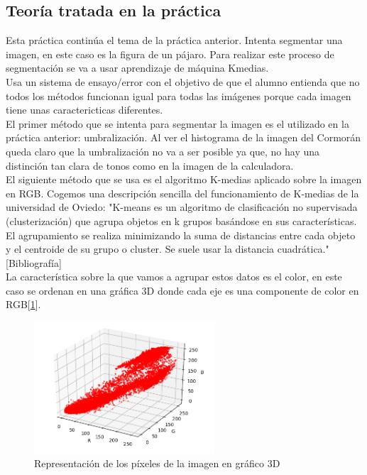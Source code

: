 \documentclass[a4paper,12pt]{report}
\begin{document}
\subsection{Teoría tratada en la práctica}

Esta práctica continúa el tema de la práctica anterior. Intenta segmentar una imagen, en este caso es la figura de un pájaro. Para realizar este proceso de segmentación se va a usar aprendizaje de máquina Kmedias.\\

Usa un sistema de ensayo/error con el objetivo de que el alumno entienda que no todos los métodos funcionan igual para todas las imágenes porque cada imagen tiene unas caractericticas diferentes.\\

El primer método que se intenta para segmentar la imagen es el utilizado en la práctica anterior: umbralización. Al ver el histograma de la imagen del Cormorán queda claro que la umbralización no va a ser posible ya que, no hay una distinción tan clara de tonos como en la imagen de la calculadora.\\

El siguiente método que se usa es el algoritmo K-medias aplicado sobre la imagen en RGB. Cogemos una descripción sencilla del funcionamiento de K-medias de la universidad de Oviedo: "K-means es un algoritmo de clasificación no supervisada (clusterización) que agrupa objetos en k grupos basándose en sus características. El agrupamiento se realiza minimizando la suma de distancias entre cada objeto y el centroide de su grupo o cluster. Se suele usar la distancia cuadrática."[Bibliografía]\\

La característica sobre la que vamos a agrupar estos datos es el color, en este caso se ordenan en una gráfica 3D donde cada eje es una componente de color en RGB[\ref{cormoranrgb}].\\

\begin{figure}[h]
\centering
\includegraphics[width=0.6\textwidth]{imagenes/cormoranrgb}
\caption{Representación de los píxeles de la imagen en gráfico 3D}
\label{cormoranrgb}
\end{figure}
\end{document}
